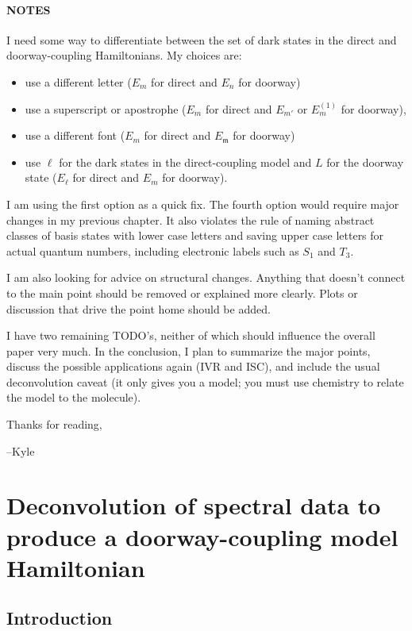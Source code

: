 \documentclass[12pt]{mitthesis}
\begin{document}
\tableofcontents
\clearpage

\subsubsection*{NOTES}

I need some way to differentiate between the set of dark states in the
direct and doorway-coupling Hamiltonians.  My choices are:
\begin{itemize}
\item use a different letter ($E_m$ for direct and $E_n$ for doorway)
\item use a superscript or apostrophe ($E_m$ for direct and $E_{m'}$
  or $E_{m}^{(1)}$ for doorway),
\item use a different font ($E_m$ for direct and $E_{\mathfrak{m}}$
  for doorway)
\item use $\ell$ for the dark states in the direct-coupling model and
  $L$ for the doorway state ($E_{\ell}$ for direct and $E_m$ for doorway).
\end{itemize}
I am using the first option as a quick fix.  The fourth option would
require major changes in my previous chapter.  It also violates the
rule of naming abstract classes of basis states with lower case
letters and saving upper case letters for actual quantum numbers,
including electronic labels such as $S_1$ and $T_3$.  

I am also looking for advice on structural changes.  Anything that
doesn't connect to the main point should be removed or explained more
clearly.  Plots or discussion that drive the point home should be
added.

I have two remaining TODO's, neither of which should influence the
overall paper very much. In the conclusion, I plan to summarize the
major points, discuss the possible applications again (IVR and ISC),
and include the usual deconvolution caveat (it only gives you a model;
you must use chemistry to relate the model to the molecule).

Thanks for reading,

--Kyle

\clearpage

\chapter{Deconvolution of spectral data to produce a doorway-coupling
  model Hamiltonian}

\section{Introduction}
\end{document}
